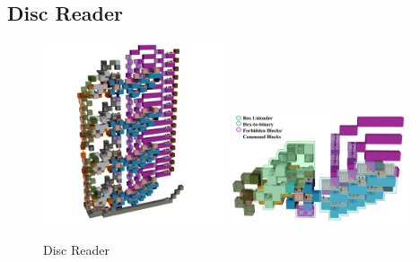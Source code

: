 \subsection{Disc Reader}
\begin{figure}[bp!]
    \begin{center}
        \includegraphics[width=0.48\textwidth]{Figures/DiscReader-small.png}
        \includegraphics[width=0.48\textwidth]{Figures/DiscReaderUnit.png}
        \caption{Disc Reader}
        \label{fig::DiscReader}
    \end{center}
\end{figure}
